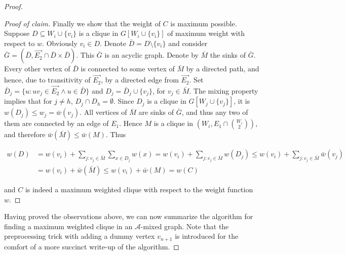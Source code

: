 \begin{proof}
\begin{proof}[Proof of claim]
		Finally we show that the weight of $C$ is maximum possible. Suppose $D \subseteq W_i \cup \{v_i\}$ is a clique in $G[W_i \cup \{v_i\}]$ of maximum weight with respect to $w$. Obviously $v_i \in D$. Denote $\bar{D} = D \setminus \{v_i\}$ and consider $\bar{G} = (\bar{D}, \overrightarrow{E_2} \cap \bar{D} \times \bar{D})$. This $\bar{G}$ is an acyclic graph. Denote by $\bar{M}$ the sinks of $\bar{G}$. Every other vertex of $\bar{D}$ is connected to some vertex of $\bar{M}$ by a directed path, and hence, due to transitivity of $\overrightarrow{E_2}$, by a directed edge from $\overrightarrow{E_2}$. Set $\bar{D}_j = \{u : uv_j \in \overrightarrow{E_2} \land u \in \bar{D}\}$ and $D_j = \bar{D}_j \cup \{v_j\}$, for $v_j \in \bar{M}$. The mixing property implies that for $j \neq h$, $D_j \cap D_h = \emptyset$. Since $D_j$ is a clique in $G[W_j \cup \{v_j\}]$, it is $w(D_j) \leq w_j = \bar{w}(v_j)$. All vertices of $\bar{M}$ are sinks of $\bar{G}$, and thus any two of them are connected by an edge of $E_1$. Hence $M$ is a clique in $(W_i , E_1 \cap \binom{W_i}{2})$, and therefore $\bar{w}(\bar{M}) \leq \bar{w}(M)$. Thus
		
		$$
		\begin{aligned}
			w(D) &= w(v_i) + \sum_{j: v_j \in \bar{M}} \sum_{x \in D_j} w(x) = w(v_i) + \sum_{j:v_j \in \bar{M}} w(D_j) \leq w(v_i) + \sum_{j:v_j \in \bar{M}} \bar{w}(v_j)\\
			& = w(v_i) + \bar{w}(\bar{M}) \leq w(v_i) + \bar{w}(M) = w(C)
		\end{aligned}
		$$
		
		and $C$ is indeed a maximum weighted clique with respect to the weight function $w$.
	\end{proof}
	
	Having proved the observations above, we can now summarize the algorithm for finding a maximum weighted clique in an $\mathcal{A}$-mixed graph. Note that the preprocessing trick with adding a dummy vertex $v_{n+1}$ is introduced for the comfort of a more succinct write-up of the algorithm.
	

\end{proof}
